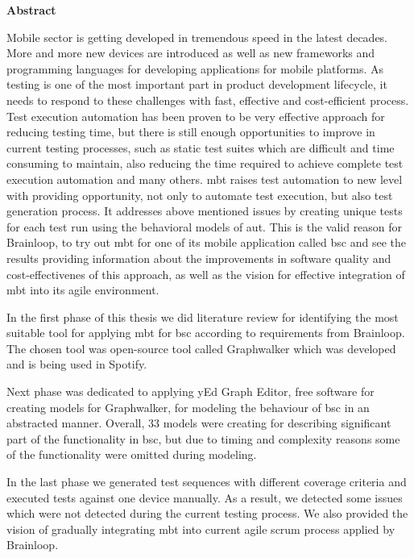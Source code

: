 \newpage
{}
\thispagestyle{empty}
\hoffset=0mm
\begin{center}
    {\Large \bf Abstract}
\end{center}
\begin{spacing}{1.35}

\par
Mobile sector is getting developed in tremendous speed in the latest decades. More and more new devices are introduced as well as new frameworks and programming languages for developing applications for mobile platforms. As testing is one of the most important part in product development lifecycle, it needs to respond to these challenges with fast, effective and cost-efficient process. Test execution automation has been proven to be very effective approach for reducing testing time, but there is still enough opportunities to improve in current testing processes, such as static test suites which are difficult and time consuming to maintain, also reducing the time required to achieve complete test execution automation and many others. \acrlong{mbt} raises test automation to new level with providing opportunity, not only to automate test execution, but also test generation process. It addresses above mentioned issues by creating unique tests for each test run using the behavioral models of \acrlong{aut}. This is the valid reason for Brainloop, to try out \acrlong{mbt} for one of its mobile application called \acrlong{bsc} and see the results providing information about the improvements in software quality and cost-effectivenes of this approach, as well as the vision for effective integration of \acrlong{mbt} into its agile environment.

\par
In the first phase of this thesis we did literature review for identifying the most suitable tool for applying \acrlong{mbt} for \acrlong{bsc} according to requirements from Brainloop. The chosen tool was open-source tool called Graphwalker which was developed and is being used in Spotify. 

\par
Next phase was dedicated to applying yEd Graph Editor, free software for creating models for Graphwalker, for modeling the behaviour of \acrlong{bsc} in an abstracted manner. Overall, 33 models were creating for describing significant part of the functionality in \acrlong{bsc}, but due to timing and complexity reasons some of the functionality were omitted during modeling.

\par
In the last phase we generated test sequences with different coverage criteria and executed tests against one device manually. As a result, we detected some issues which were not detected during the current testing process. We also provided the vision of gradually integrating \acrlong{mbt} into current agile scrum process applied by Brainloop.

\end{spacing}
